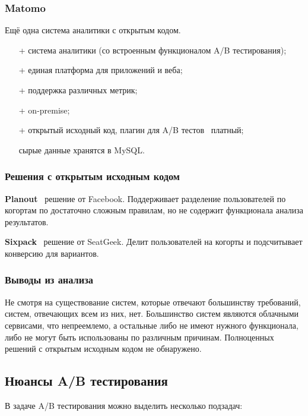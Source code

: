 \documentclass[../document.tex]{subfiles}
\begin{document}
    \subsubsection{Matomo}
    \par Ещё одна система\cite{noauthor_matomo_nodate} аналитики с открытым кодом.
    \begin{enumerate}
        \item[+] система аналитики (со встроенным функционалом A/B тестирования);
        \item[+] единая платформа для приложений и веба;
        \item[+] поддержка различных метрик; 
        \item[+] on-premise;
        \item[+] открытый исходный код, плагин для A/B тестов \textemdash\ платный; 
        \item[\textminus] сырые данные хранятся в MySQL. 
    \end{enumerate}
    \subsubsection{Решения с открытым исходным кодом}
    \par \textbf{Planout}\cite{noauthor_planout_nodate} \textemdash\ решение от Facebook. Поддерживает разделение пользователей по когортам по достаточно сложным правилам, но не содержит функционала анализа результатов.
    \par \textbf{Sixpack}\cite{noauthor_sixpack_nodate} \textemdash\ решение от SeatGeek. Делит пользователей на когорты и подсчитывает конверсию для вариантов.
    \subsubsection{Выводы из анализа}
    \par Не смотря на существование систем, которые отвечают большинству требований, систем, отвечающих всем из них, нет. Большинство систем являются облачными сервисами, что непреемлемо, а остальные либо не имеют нужного функционала, либо не могут быть использованы по различным причинам. Полноценных решений с открытым исходным кодом не обнаружено.
    \subsection{Нюансы A/B тестирования}
    \par В задаче A/B тестирования можно выделить несколько подзадач:
\end{document}
